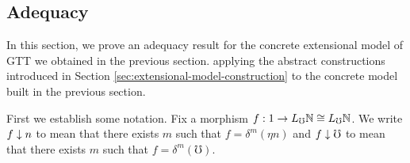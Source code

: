 \subsection{Adequacy}\label{sec:adequacy}

In this section, we prove an adequacy result for the concrete extensional model of GTT we obtained in the previous section.
applying the abstract constructions introduced in Section
\ref{sec:extensional-model-construction} to the concrete model built in the previous section.

First we establish some notation. Fix a morphism $f : 1 \to L_\mho \mathbb{N} \cong L_\mho \mathbb{N}$.
We write $f \downarrow n$ to mean that there exists $m$ such that $f = \delta^m(\eta n)$
and $f \downarrow \mho$ to mean that there exists $m$ such that $f = \delta^m(\mho)$.


